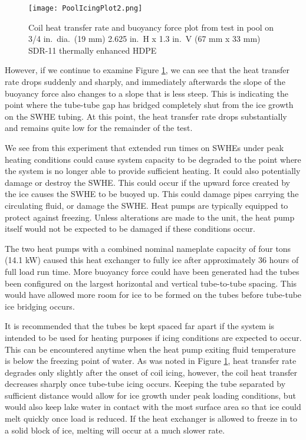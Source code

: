 	\begin{figure}
		\centering
		\texttt{[image: PoolIcingPlot2.png]}
		\caption[Coil heat transfer rate and buoyancy force from coil icing test on the 3/4 in.\ dia.\ (19 mm) 2.625 in.\ H x 1.3 in.\ V (67 mm x 33 mm) coil]{Coil heat transfer rate and buoyancy force plot from test in pool on 3/4 in.\ dia.\ (19 mm) 2.625 in.\ H x 1.3 in.\ V (67 mm x 33 mm) SDR-11 thermally enhanced HDPE}
		\label{fig:ExpResult:HeatExtr:CoilIcing:PoolIcingPlot2}
	\end{figure}

However, if we continue to examine Figure \ref{fig:ExpResult:HeatExtr:CoilIcing:PoolIcingPlot2}, we can see that the heat transfer rate drops suddenly and sharply, and immediately afterwards the slope of the buoyancy force also changes to a slope that is less steep. This is indicating the point where the tube-tube gap has bridged completely shut from the ice growth on the SWHE tubing. At this point, the heat transfer rate drops substantially and remains quite low for the remainder of the test.

We see from this experiment that extended run times on SWHEs under peak heating conditions could cause system capacity to be degraded to the point where the system is no longer able to provide sufficient heating. It could also potentially damage or destroy the SWHE. This could occur if the upward force created by the ice causes the SWHE to be buoyed up. This could damage pipes carrying the circulating fluid, or damage the SWHE. Heat pumps are typically equipped to protect against freezing. Unless alterations are made to the unit, the heat pump itself would not be expected to be damaged if these conditions occur.

The two heat pumps with a combined nominal nameplate capacity of four tons (14.1 kW) caused this heat exchanger to fully ice after approximately 36 hours of full load run time. More buoyancy force could have been generated had the tubes been configured on the largest horizontal and vertical tube-to-tube spacing. This would have allowed more room for ice to be formed on the tubes before tube-tube ice bridging occurs.

It is recommended that the tubes be kept spaced far apart if the system is intended to be used for heating purposes if icing conditions are expected to occur. This can be encountered anytime when the heat pump exiting fluid temperature is below the freezing point of water. As was noted in Figure \ref{fig:ExpResult:HeatExtr:CoilIcing:PoolIcingPlot2}, heat transfer rate degrades only slightly after the onset of coil icing, however, the coil heat transfer decreases sharply once tube-tube icing occurs. Keeping the tube separated by sufficient distance would allow for ice growth under peak loading conditions, but would also keep lake water in contact with the most surface area so that ice could melt quickly once load is reduced. If the heat exchanger is allowed to freeze in to a solid block of ice, melting will occur at a much slower rate.

